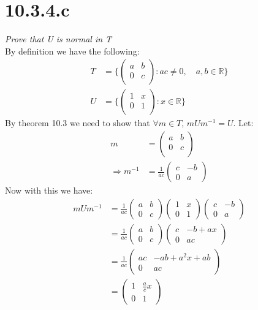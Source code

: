 \documentclass[a4paper, 11pt]{article}
\begin{document}
\section*{10.3.4.c}
\textit{Prove that U is normal in T}\\ 

\noindent By definition we have the following: 
	\begin{align}
		T &= \Bigg\{ \begin{pmatrix}
			a & b \\ 
			0 & c \\ 
		\end{pmatrix} : ac\neq 0, \quad a,b \in \mathbb{R}\Bigg\}\\ 
		U &= \Bigg\{ \begin{pmatrix}
			1 & x \\ 
			0 & 1 \\
		\end{pmatrix} : x \in \mathbb{R} \Bigg\}
	\end{align}
By theorem 10.3 we need to show that $\forall m \in T$, $mUm^{-1}=U$. Let: 
	\begin{align*}
		m &= \begin{pmatrix}
			a & b \\ 
			0 & c \\ 
		\end{pmatrix} \\ 
		\Rightarrow m^{-1} &= \frac{1}{ac}\begin{pmatrix}
			c & -b \\ 
			0 & a
		\end{pmatrix}
	\end{align*}
Now with this we have: 
	\begin{align*}
		mUm^{-1} &= \frac{1}{ac}\begin{pmatrix}
			a & b \\ 
			0 & c 
		\end{pmatrix} \begin{pmatrix}
			1 & x \\ 
			0 & 1 
		\end{pmatrix} \begin{pmatrix}
			c & -b \\ 
			0 & a 
		\end{pmatrix} \\ 
		&= \frac{1}{ac}\begin{pmatrix}
			a & b \\ 
			0 & c 
		\end{pmatrix}\begin{pmatrix}
			c & -b + ax \\ 
			0 & ac 
		\end{pmatrix} \\ 
		&= \frac{1}{ac}\begin{pmatrix}
			ac & -ab +a^2x + ab \\ 
			0 & ac 
		\end{pmatrix}\\
		&= \begin{pmatrix}
			1 & \frac{a}{c}x \\ 
			0 & 1 
		\end{pmatrix}
	\end{align*}
\end{document}
